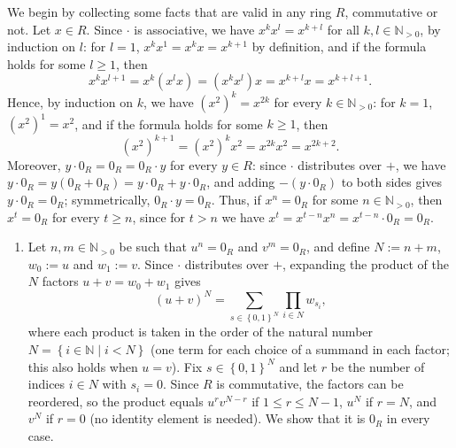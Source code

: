 \begin{solution}
    We begin by collecting some facts that are valid in any ring \( R \), commutative or not. Let \( x \in R \). Since \( \cdot \) is associative, we have \( x^{k} x^{l} = x^{k+l} \) for all \( k, l \in \mathbb{N}_{>0} \), by induction on \( l \): for \( l = 1 \), \( x^{k} x^{1} = x^{k} x = x^{k+1} \) by definition, and if the formula holds for some \( l \geq 1 \), then
    \[
        x^{k} x^{l+1} = x^{k} \left(x^{l} x\right) = \left(x^{k} x^{l}\right) x = x^{k+l} x = x^{k+l+1}.
    \]
    Hence, by induction on \( k \), we have \( \left(x^{2}\right)^{k} = x^{2k} \) for every \( k \in \mathbb{N}_{>0} \): for \( k = 1 \), \( \left(x^{2}\right)^{1} = x^{2} \), and if the formula holds for some \( k \geq 1 \), then
    \[
        \left(x^{2}\right)^{k+1} = \left(x^{2}\right)^{k} x^{2} = x^{2k} x^{2} = x^{2k+2}.
    \]
    Moreover, \( y \cdot 0_R = 0_R = 0_R \cdot y \) for every \( y \in R \): since \( \cdot \) distributes over \( + \), we have \( y \cdot 0_R = y \left(0_R + 0_R\right) = y \cdot 0_R + y \cdot 0_R \), and adding \( -\left(y \cdot 0_R\right) \) to both sides gives \( y \cdot 0_R = 0_R \); symmetrically, \( 0_R \cdot y = 0_R \). Thus, if \( x^{n} = 0_R \) for some \( n \in \mathbb{N}_{>0} \), then \( x^{t} = 0_R \) for every \( t \geq n \), since for \( t > n \) we have \( x^{t} = x^{t-n} x^{n} = x^{t-n} \cdot 0_R = 0_R \).
    \begin{enumerate}
        \item[(a)] Let \( n, m \in \mathbb{N}_{>0} \) be such that \( u^{n} = 0_R \) and \( v^{m} = 0_R \), and define \( N := n + m \), \( w_{0} := u \) and \( w_{1} := v \). Since \( \cdot \) distributes over \( + \), expanding the product of the \( N \) factors \( u + v = w_{0} + w_{1} \) gives
            \[
                \left(u + v\right)^{N} = \sum_{s \in \left\{0, 1\right\}^{N}} \prod_{i \in N} w_{s_{i}},
            \]
            where each product is taken in the order of the natural number \( N = \left\{ i \in \mathbb{N} \mid i < N \right\} \) (one term for each choice of a summand in each factor; this also holds when \( u = v \)). Fix \( s \in \left\{0, 1\right\}^{N} \) and let \( r \) be the number of indices \( i \in N \) with \( s_{i} = 0 \). Since \( R \) is commutative, the factors can be reordered, so the product equals \( u^{r} v^{N-r} \) if \( 1 \leq r \leq N - 1 \), \( u^{N} \) if \( r = N \), and \( v^{N} \) if \( r = 0 \) (no identity element is needed). We show that it is \( 0_R \) in every case.
            \\\\

\end{enumerate}
\end{solution}
